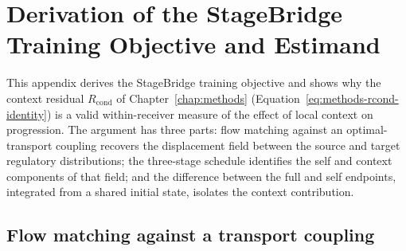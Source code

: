\chapter{Derivation of the StageBridge Training Objective and Estimand} \label{chap:appendix-b}


This appendix derives the StageBridge training objective and shows why the context residual
$R_{\mathrm{cond}}$ of Chapter~\ref{chap:methods} (Equation~\ref{eq:methods-rcond-identity}) is a valid within-receiver
measure of the effect of local context on progression. The argument has three parts: flow matching
against an optimal-transport coupling recovers the displacement field between the source and target
regulatory distributions; the three-stage schedule identifies the self and context components of that
field; and the difference between the full and self endpoints, integrated from a shared initial state,
isolates the context contribution.

\section{Flow matching against a transport coupling}

